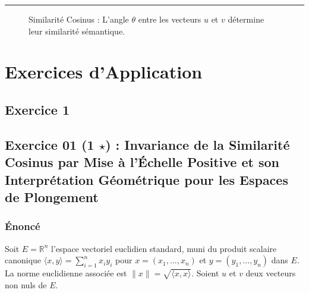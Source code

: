 \documentclass[11pt,a4paper]{report}
\begin{document}
\begin{center}\rule{0.5\linewidth}{0.5pt}\end{center}



\begin{figure}[h]
\centering
{}
\caption{Similarité Cosinus : L'angle $\theta$ entre les vecteurs $u$ et $v$ détermine leur similarité sémantique.}
\end{figure}
\chapter{Exercices d'Application}
\section*{Exercice 1}
\hypertarget{exercice-01-1-star-invariance-de-la-similarituxe9-cosinus-par-mise-uxe0-luxe9chelle-positive-et-son-interpruxe9tation-guxe9omuxe9trique-pour-les-espaces-de-plongement}{%
\section{\texorpdfstring{Exercice 01 (1 \(\star\)) : Invariance de la
Similarité Cosinus par Mise à l'Échelle Positive et son Interprétation
Géométrique pour les Espaces de
Plongement}{Exercice 01 (1 \textbackslash star) : Invariance de la Similarité Cosinus par Mise à l'Échelle Positive et son Interprétation Géométrique pour les Espaces de Plongement}}\label{exercice-01-1-star-invariance-de-la-similarituxe9-cosinus-par-mise-uxe0-luxe9chelle-positive-et-son-interpruxe9tation-guxe9omuxe9trique-pour-les-espaces-de-plongement}}

\hypertarget{uxe9noncuxe9}{%
\subsection{Énoncé}\label{uxe9noncuxe9}}

Soit \(E = \mathbb{R}^n\) l'espace vectoriel euclidien standard, muni du
produit scalaire canonique
\(\langle x, y \rangle = \sum_{i=1}^n x_i y_i\) pour
\(x=(x_1, \dots, x_n)\) et \(y=(y_1, \dots, y_n)\) dans \(E\). La norme
euclidienne associée est \(\|x\| = \sqrt{\langle x, x \rangle}\). Soient
\(u\) et \(v\) deux vecteurs non nuls de \(E\).
\end{document}
